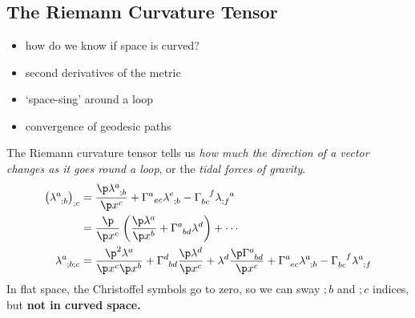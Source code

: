 \documentclass[a4paper, 11pt, normalem]{report}
\begin{document}
\chapter{}
\section{The Riemann Curvature Tensor}
\begin{itemize}
    \item how do we know if space is curved?
    \item second derivatives of the metric
    \item `space-sing' around a loop
    \item convergence of geodesic paths
\end{itemize}
The Riemann curvature tensor tells us \emph{how much the direction of a vector changes as it goes round a loop}, or the \emph{tidal forces of gravity}.
\begin{align}
    \tensor{\left(\tensor{\lambda}{^a_{;b}}\right)}{_{;c}} &= \frac{\p\tensor{\lambda}{^a_{;b}}}{\p x^c} + \tensor{\Gamma}{^a}{_{ec}}\tensor{\lambda}{^e_{;b}} - \tensor{\Gamma}{_{bc}^f}\tensor{\lambda}{_{;f}^a} \\
                                                         &= \frac{\p}{\p x^c}\left(\frac{\p\lambda^a}{\p x^b} + \tensor{\Gamma}{^a_{bd}}\lambda^d\right) + \cdots \\
    \tensor{\lambda}{^a_{;b;c}} &= \frac{\p^2\lambda^a}{\p x^c \p x^b} + \tensor{\Gamma}{^d_{bd}}\frac{\p\lambda^d}{\p x^c} + \lambda^d\frac{\p\tensor{\Gamma}{^a_{bd}}}{\p x^c} + \tensor{\Gamma}{^a_{ec}}\tensor{\lambda}{^a_{;b}}-\tensor{\Gamma}{_{bc}^f}\tensor{\lambda}{^a_{;f}}
\end{align}
In flat space, the Christoffel symbols go to zero, so we can sway $;b$ and $;c$ indices, but \textbf{not in curved space.}
\end{document}
